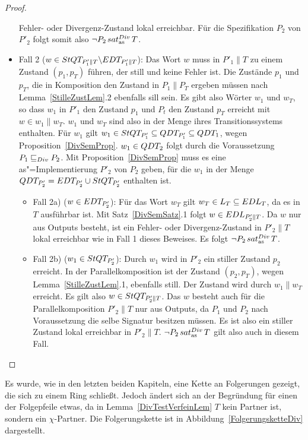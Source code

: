 \begin{proof}
\begin{itemize}
      Fehler- oder Divergenz-Zustand lokal erreichbar. Für die Spezifikation
      $P_2$ von $P'_2$ folgt somit also $\neg P_2\hspace{0.05cm}sat_\mathrm{as}^{Div}\hspace{0.05cm} T$.
    \item Fall 2 ($w\in StQT _{P'_1\|T} \backslash EDT _{P'_1\|T}$): Das Wort
      $w$ muss in $P'_1\|T$ zu einem Zustand $(p_1,p_T)$ führen, der still und
      keine Fehler ist. Die Zustände $p_1$ und $p_T$, die in Komposition den
      Zustand in $P_1\|P_T$ ergeben müssen nach Lemma~\ref{StilleZustLem}.2
      ebenfalls sill sein. Es gibt also Wörter $w_1$ und $w_T$, so dass $w_1$
      in $P'_1$ den Zustand $p_1$ und $P_t$ den Zustand $p_T$ erreicht mit
      $w\in w_1\|w_T$. $w_1$ und $w_T$ sind also in der Menge \StQT{} ihres
      Transitionssystems enthalten. Für $w_1$ gilt $w_1\in StQT _{P'_1}
      \subseteq QDT _{P'_1}\subseteq QDT _1$, wegen
      Proposition~\ref{DivSemProp}. $w_1\in QDT _2$ folgt durch die
      Voraussetzung $P_1 \sqsubseteq  _{Div} P_2$. Mit Proposition~\ref{DivSemProp} muss es
      eine as"=Implementierung $P'_2$ von $P_2$ geben, für die $w_1$ in der
      Menge $QDT _{P'_2} = EDT _{P'_2} \cup StQT _{P'_2}$ enthalten ist.
      \begin{itemize}
        \item Fall 2a) ($w\in EDT _{P'_2}$): Für das Wort $w_T$ gilt $w_T\in L
          _T\subseteq EDL _T$, da es in $T$ ausführbar ist. Mit
          Satz~\ref{DivSemSatz}.1 folgt $w\in EDL _{P'_2\|T}$. Da $w$ nur aus
          Outputs besteht, ist ein Fehler- oder Divergenz-Zustand in $P'_2\|T$
          lokal erreichbar wie in Fall 1 dieses Beweises. Es folgt $\neg P_2
          \hspace{0.05cm}sat_\mathrm{as}^{Div}\hspace{0.05cm} T$.
        \item Fall 2b) ($w_1\in StQT _{P'_2}$): Durch $w_1$ wird in $P'_2$ ein
          stiller Zustand $p_2$ erreicht. In der Parallelkomposition ist der
          Zustand $(p_2,p_T)$, wegen Lemma~\ref{StilleZustLem}.1, ebenfalls
          still. Der Zustand wird durch $w_1\|w_T$ erreicht. Es gilt also
          $w\in StQT _{P'_2\|T}$. Das $w$ besteht auch für die
          Parallelkomposition $P'_2\|T$ nur aus Outputs, da $P_1$ und $P_2$
          nach Voraussetzung die selbe Signatur besitzen müssen. Es ist also
          ein stiller Zustand lokal erreichbar in $P'_2\|T$. $\neg P_2\hspace{0.05cm}sat_\mathrm{as}^{Div}\hspace{0.05cm}
          T$ gilt also auch in diesem Fall.
      \end{itemize}
  \end{itemize}
\end{proof}

Es wurde, wie in den letzten beiden Kapiteln, eine Kette an Folgerungen
gezeigt, die sich zu einem Ring schließt. Jedoch ändert sich an der Begründung
für einen der Folgepfeile etwas, da in Lemma~\ref{DivTestVerfeinLem} $T$ kein
Partner ist, sondern ein $\chi$-Partner. Die Folgerungskette ist in
Abbildung~\ref{FolgerungsketteDiv} dargestellt.

